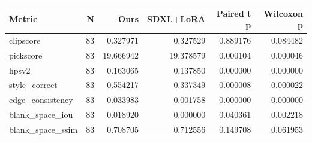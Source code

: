 \begin{tabular}{lrrrrr}
\toprule
Metric & N & Ours & SDXL+LoRA & Paired t p & Wilcoxon p \\
\midrule
clipscore & 83 & 0.327971 & 0.327529 & 0.889176 & 0.084482 \\
pickscore & 83 & 19.666942 & 19.378579 & 0.000104 & 0.000046 \\
hpsv2 & 83 & 0.163065 & 0.137850 & 0.000000 & 0.000000 \\
style_correct & 83 & 0.554217 & 0.337349 & 0.000008 & 0.000022 \\
edge_consistency & 83 & 0.033983 & 0.001758 & 0.000000 & 0.000000 \\
blank_space_iou & 83 & 0.018920 & 0.000000 & 0.040361 & 0.002218 \\
blank_space_ssim & 83 & 0.708705 & 0.712556 & 0.149708 & 0.061953 \\
\bottomrule
\end{tabular}
